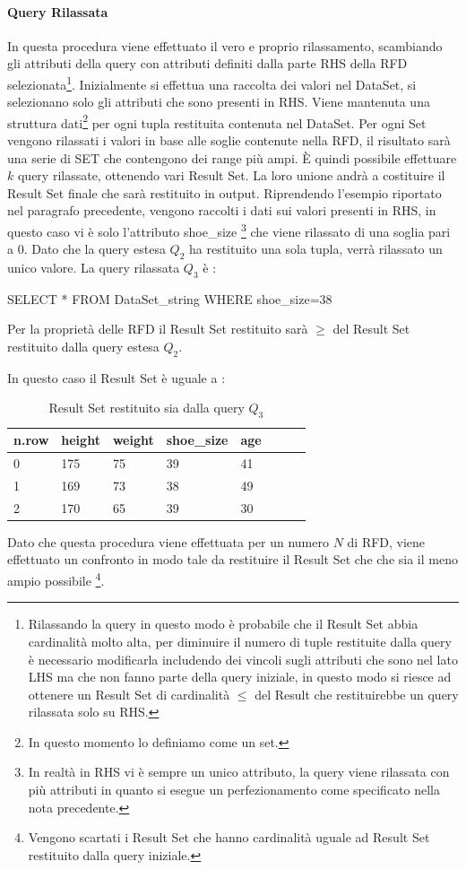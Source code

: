 \paragraph{Query Rilassata}
In questa procedura viene effettuato il vero e proprio rilassamento, scambiando gli attributi della query con attributi definiti dalla parte RHS della RFD selezionata\footnote{Rilassando la query in questo modo è probabile che il Result Set abbia cardinalità molto alta, per diminuire il numero di tuple restituite dalla query è necessario modificarla includendo dei vincoli sugli attributi che sono nel lato LHS ma che non fanno parte della query iniziale, in questo modo si riesce ad ottenere un Result Set di cardinalità $\leq$ del Result che restituirebbe un query rilassata solo su RHS.}.
Inizialmente si effettua una raccolta dei valori nel DataSet, si selezionano solo gli attributi che sono presenti in RHS. Viene mantenuta una struttura dati\footnote{In questo momento lo definiamo come un set.} per ogni tupla restituita contenuta nel DataSet. 
Per ogni Set vengono rilassati i valori in base alle soglie contenute nella RFD, il risultato sarà una serie di SET che contengono dei range più ampi.
È quindi possibile effettuare $k$ query rilassate, ottenendo vari Result Set. La loro unione andrà a costituire il Result Set finale che sarà restituito in output.
Riprendendo l'esempio riportato nel paragrafo precedente, vengono raccolti i dati sui valori presenti in RHS, in questo caso vi è solo l'attributo shoe{\_}size \footnote{In realtà in RHS vi è sempre un unico attributo, la query viene rilassata con più attributi in quanto si esegue un perfezionamento come specificato nella nota precedente.} che viene rilassato di una soglia pari a 0. Dato che la query estesa $Q_2$ ha restituito una sola tupla, verrà rilassato un unico valore. La query rilassata $Q_3$  è : \newline 
\centerline{SELECT * FROM DataSet{\_}string WHERE shoe{\_}size=38}
\newline
Per la proprietà delle RFD il Result Set restituito sarà $\geq$ del Result Set restituito dalla query estesa $Q_2$.

In questo caso il Result Set è uguale a :
\begin{table}[H]
    \centering
    \begin{tabular}{l l l l l l l l}
    n.row  & height & weight & shoe{\_}size & age \\
    \hline
    0  & 175 & 75 & 39 & 41 \\
    1  & 169 & 73 & 38 & 49 \\
    2  & 170 & 65 & 39 & 30 \\
    \end{tabular}
    \caption{Result Set restituito sia dalla query $Q_3$ }
    \label{tab:relax_result_set}
\end{table}

Dato che questa procedura viene effettuata per un numero $N$ di RFD, viene effettuato un confronto in modo tale da restituire il Result Set che che sia il meno ampio possibile \footnote{Vengono scartati i Result Set che hanno cardinalità uguale ad Result Set restituito dalla query iniziale.}.


